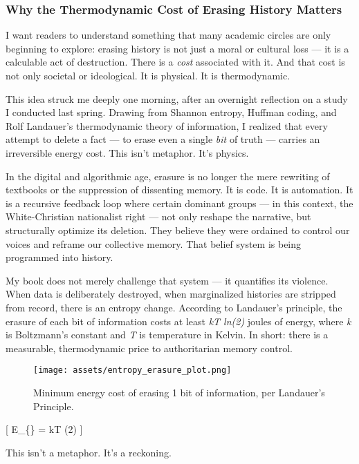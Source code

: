 \subsubsection{Why the Thermodynamic Cost of Erasing History
Matters}\label{why-the-thermodynamic-cost-of-erasing-history-matters}

I want readers to understand something that many academic circles are
only beginning to explore: erasing history is not just a moral or
cultural loss --- it is a calculable act of destruction. There is a
\emph{cost} associated with it. And that cost is not only societal or
ideological. It is physical. It is thermodynamic.

This idea struck me deeply one morning, after an overnight reflection on
a study I conducted last spring. Drawing from Shannon entropy, Huffman
coding, and Rolf Landauer's thermodynamic theory of information, I
realized that every attempt to delete a fact --- to erase even a single
\emph{bit} of truth --- carries an irreversible energy cost. This isn't
metaphor. It's physics.

In the digital and algorithmic age, erasure is no longer the mere
rewriting of textbooks or the suppression of dissenting memory. It is
code. It is automation. It is a recursive feedback loop where certain
dominant groups --- in this context, the White-Christian nationalist
right --- not only reshape the narrative, but structurally optimize its
deletion. They believe they were ordained to control our voices and
reframe our collective memory. That belief system is being programmed
into history.

My book does not merely challenge that system --- it quantifies its
violence. When data is deliberately destroyed, when marginalized
histories are stripped from record, there is an entropy change.
According to Landauer's principle, the erasure of each bit of
information costs at least \emph{kT ln(2)} joules of energy, where
\emph{k} is Boltzmann's constant and \emph{T} is temperature in Kelvin.
In short: there is a measurable, thermodynamic price to authoritarian
memory control.

\begin{figure}[h]
\centering
\texttt{[image: assets/entropy\_erasure\_plot.png]}
\caption{Minimum energy cost of erasing 1 bit of information, per Landauer's Principle.}
\end{figure}

{[} E\_\{\} = kT \ln(2) {]}

This isn't a metaphor. It's a reckoning.

